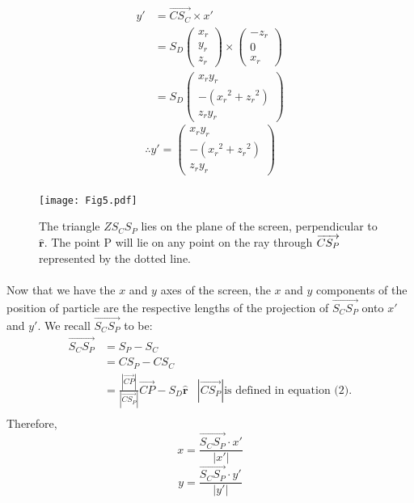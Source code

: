 \documentclass{article}
\newcommand\xp{x\prime\xspace}
\newcommand\yp{y\prime\xspace}
\begin{document}
	\begin{align*}
		\yp & = \overrightarrow{C S_C} \times \xp \\
		     & = S_D  \begin{pmatrix}x_r\\y_r\\z_r\end{pmatrix} \times \begin{pmatrix} -z_r\\ 0\\ x_r \end{pmatrix} \\
		     & = S_D \begin{pmatrix} x_r y_r \\ -\left({x_r}^2 + {z_r}^2\right) \\ z_r y_r \end{pmatrix}
	\end{align*}
	\begin{equation}
		\therefore \yp = \begin{pmatrix} x_r y_r \\ -\left({x_r}^2 + {z_r}^2\right) \\ z_r y_r \end{pmatrix}
	\end{equation}
	\paragraph{}

	\begin{figure}
		\centering
		\texttt{[image: Fig5.pdf]}
		\caption{The triangle $Z S_C S_P$ lies on the plane of the screen, perpendicular to $\hat{\mathbf{r}}$. The point P will lie on any point on the ray through $\protect\overrightarrow{C S_P}$ represented by the dotted line.}
		\label{fig:screen}
	\end{figure}

	\paragraph{}
	Now that we have the $x$ and $y$ axes of the screen, the $x$ and $y$ components of the position of particle are the respective lengths of the projection of $\overrightarrow{S_C S_P}$ onto $\xp$ and $\yp$.
	We recall $\overrightarrow{S_C S_P}$ to be:
	\begin{align*}
		\overrightarrow{S_C S_P} & = S_P - S_C \\
		& = C S_P - C S_C \\
		& = \frac{\left|\overrightarrow{CP}\right|}{\left|\overrightarrow{C S_P}\right|} \overrightarrow{CP} - S_D \hat{\mathbf{r}}
			& \left|\overrightarrow{C S_P}\right| \text{is defined in equation (2).} \\
	\end{align*}
	Therefore,
	$$x = \frac{\overrightarrow{S_C S_P} \cdot \xp}{\left|\xp\right|} $$
	$$y = \frac{\overrightarrow{S_C S_P} \cdot \yp}{\left|\yp\right|} $$
\end{document}
